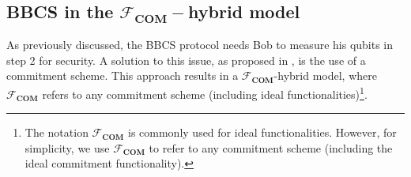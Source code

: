 \subsection{BBCS in the $\mathcal{F}_{\textbf{COM}}-$hybrid model}\label{BBCS-com-hybrid}

As previously discussed, the BBCS protocol needs Bob to measure his qubits in step 2 for security. A solution to this issue, as proposed in \cite{BBCS92}, is the use of a commitment scheme. This approach results in a $\mathcal{F}_{\textbf{COM}}$-hybrid model, where $\mathcal{F}_{\textbf{COM}}$ refers to any commitment scheme (including ideal functionalities)\footnote{The notation $\mathcal{F}_{\textbf{COM}}$ is commonly used for ideal functionalities. However, for simplicity, we use $\mathcal{F}_{\textbf{COM}}$ to refer to any commitment scheme (including the ideal commitment functionality).}. 


